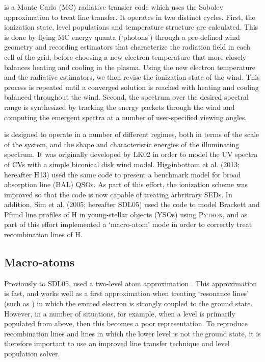 \documentclass[preprint, a4paper, 11pt]{aastex}
\begin{document}
{\py is a Monte Carlo (MC) radiative transfer code which uses
the Sobolev approximation to treat line transfer. It operates 
in two distinct cycles. First, the ionization state, level populations
and temperature structure are calculated. This is done by
flying MC energy quanta (`photons') through a pre-defined wind geometry and recording
estimators that characterize the radiation field in each cell of the grid, before choosing  a new electron temperature 
that more closely balances heating and cooling in the plasma. Using the new electron temperature and the radiative estimators, we then
revise the ionization state of the wind.  
This process is repeated until a converged
solution is reached with heating and cooling balanced throughout the wind. 
Second, the spectrum over the desired spectral range is synthesized by tracking
the energy packets through the wind and computing the 
emergent spectra at a number of user-specified viewing angles.

\py is designed to operate in a number of different
regimes, both in terms of the scale of the system, and the 
shape and characteristic energies of the illuminating spectrum. 
It was originally developed by LK02 in order to model the UV spectra
of CVs with a simple biconical disk wind model.
Higginbottom et al.\nocite{higginbottom2013} (2013; hereafter H13) used the same code to
present a benchmark model for broad absorption line (BAL) QSOs.
As part of this effort, the ionization scheme was improved so that 
the code is now capable of treating arbritrary SEDs.
In addition, Sim et al. (2005; hereafter SDL05)\nocite{simmacro2005} used the code to model
Brackett and Pfund line profiles of H in young-stellar objects (YSOs) using \textsc{Python,} and as part of this effort 
implemented a `macro-atom' mode  in order to correctly treat recombination lines of H.



\subsection{Macro-atoms}

Previously to SDL05, \py used a two-level atom approximation \cite[see e.g.][]{mihalas}. This approximation is 
fast, and works well as a first approximation when treating  `resonance lines' (such as \civfull) 
in which the excited electron is strongly coupled to the ground state.
However, in a number of situations, for example, when a level is primarily populated from above, then
this becomes a poor representation. 
To reproduce recombination lines and lines in which the lower level is not the ground state, 
it is therefore important to use an improved line transfer technique and level population solver.

}
\end{document}
